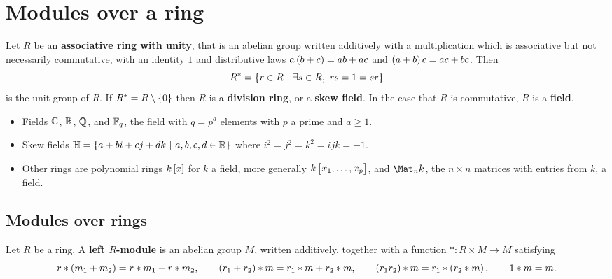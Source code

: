 





\setcounter{section}{0}

\section{Modules over a ring}


Let $ R $ be an \textbf{associative ring with unity}, that is an abelian group written additively with a multiplication which is associative but not necessarily commutative, with an identity $ 1 $ and distributive laws $ a\br{b + c} = ab + ac $ and $ \br{a + b}c = ac + bc $. Then
$$ R^* = \cbr{r \in R \st \exists s \in R, \ rs = 1 = sr} $$
is the unit group of $ R $. If $ R^* = R \setminus \cbr{0} $ then $ R $ is a \textbf{division ring}, or a \textbf{skew field}. In the case that $ R $ is commutative, $ R $ is a \textbf{field}.

\begin{example*}
\hfill
\begin{itemize}
\item Fields $ \mathbb{C} $, $ \mathbb{R} $, $ \mathbb{Q} $, and $ \mathbb{F}_q $, the field with $ q = p^a $ elements with $ p $ a prime and $ a \ge 1 $.
\item Skew fields $ \HH = \cbr{a + bi + cj + dk \st a, b, c, d \in \RR} $ where $ i^2 = j^2 = k^2 = ijk = -1 $.
\item Other rings are polynomial rings $ k\sbr{x} $ for $ k $ a field, more generally $ k\sbr{x_1, \dots, x_p} $, and $ \Mat_n k $, the $ n \times n $ matrices with entries from $ k $, a field.
\end{itemize}
\end{example*}

\subsection{Modules over rings}

\begin{definition}
Let $ R $ be a ring. A \textbf{left $ R $-module} is an abelian group $ M $, written additively, together with a function $ * : R \times M \to M $ satisfying
$$ r * \br{m_1 + m_2} = r * m_1 + r * m_2, \qquad \br{r_1 + r_2} * m = r_1 * m + r_2 * m, \qquad \br{r_1r_2} * m = r_1 * \br{r_2 * m}, \qquad 1 * m = m. $$
\end{definition}

